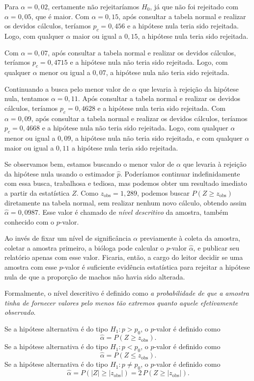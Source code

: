\documentclass[12pt,a4paper]{article}
\theoremstyle{plain}
\theoremstyle{definition}
\theoremstyle{remark}
\begin{document}
Para $\alpha=0,02$, certamente não rejeitaríamos $H_0$, já que não foi rejeitado com $\alpha=0,05$, que é maior.
Com $\alpha=0,15$, após consultar a tabela normal e realizar os devidos cálculos, teríamos $p_c = 0,456$ e a hipótese nula teria sido rejeitada.
Logo, com qualquer $\alpha$ maior ou igual a $0,15$, a hipótese nula teria sido rejeitada.

Com $\alpha=0,07$, após consultar a tabela normal e realizar os devidos cálculos, teríamos $p_c = 0,4715$ e a hipótese nula não teria sido rejeitada.
Logo, com qualquer $\alpha$ menor ou igual a $0,07$, a hipótese nula não teria sido rejeitada.

Continuando a busca pelo menor valor de $\alpha$ que levaria à rejeição da hipótese nula, tentamos $\alpha=0,11$.
Após consultar a tabela normal e realizar os devidos cálculos, teríamos $p_c = 0,4628$ e a hipótese nula teria sido rejeitada.
Com $\alpha=0,09$, após consultar a tabela normal e realizar os devidos cálculos, teríamos $p_c = 0,4668$ e a hipótese nula não teria sido rejeitada.
Logo, com qualquer $\alpha$ menor ou igual a $0,09$, a hipótese nula não teria sido rejeitada, e com qualquer $\alpha$ maior ou igual a $0,11$ a hipótese nula teria sido rejeitada.

Se observamos bem, estamos buscando o menor valor de $\alpha$ que levaria à rejeição da hipótese nula usando o estimador $\hat{p}$.
Poderíamos continuar indefinidamente com essa busca, trabalhosa e tediosa, mas podemos obter um resultado imediato a partir da estatística $Z$.
Como $z_{\mathrm{obs}}=1,289$, podemos buscar $P(Z \geq z_{\mathrm{obs}})$ diretamente na tabela normal, sem realizar nenhum novo cálculo, obtendo assim $\hat{\alpha}=0,0987$.
Esse valor é chamado de \emph{nível descritivo} da amostra, também conhecido com o $p$-valor.

Ao invés de fixar um nível de significância $\alpha$ previamente à coleta da amostra, coletar a amostra primeiro, a bióloga pode calcular o $p$-valor $\hat{\alpha}$, e publicar seu relatório apenas com esse valor. Ficaria, então, a cargo do leitor decidir se uma amostra com esse $p$-valor é suficiente evidência estatística para rejeitar a hipótese nula de que a proporção de machos não havia sido alterada.

Formalmente, o nível descritivo é definido como \emph{a probabilidade de que a amostra tinha de fornecer valores pelo menos tão extremos quanto aquele efetivamente observado}.

Se a hipótese alternativa é do tipo $H_1:p>p_0$, o $p$-valor é definido como
\[
\hat{\alpha}
=
P(Z \geq z_{\mathrm{obs}})
.
\]
Se a hipótese alternativa é do tipo $H_1:p < p_0$, o $p$-valor é definido como
\[
\hat{\alpha}
=
P(Z \leq z_{\mathrm{obs}})
.
\]
Se a hipótese alternativa é do tipo $H_1:p \ne p_0$, o $p$-valor é definido como
\[
\hat{\alpha}
=
P(|Z| \geq |z_{\mathrm{obs}}|)
=
2\, P(Z \geq |z_{\mathrm{obs}}|)
.
\]
\end{document}
